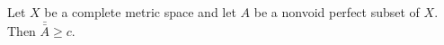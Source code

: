 Let $X$ be a complete metric space and let $A$ be a nonvoid perfect subset of $X$. Then $\bar{\bar{A}} \geq c$.